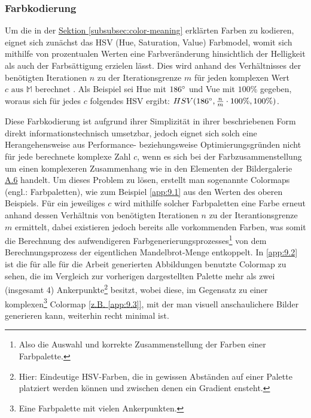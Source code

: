 \subsubsection{Farbkodierung}\label{subsubsec:color-coding}

Um die in der \hyperref[subsubsec:color-meaning]{Sektion \ref{subsubsec:color-meaning}}
erklärten Farben zu kodieren, eignet sich zunächst das HSV (Hue, Saturation, Value)
Farbmodel, womit sich mithilfe von prozentualen Werten eine
Farbveränderung hinsichtlich der Helligkeit als auch der Farbsättigung erzielen lässt.
Dies wird anhand des Verhältnisses der benötigten Iterationen $n$ zu der Iterationsgrenze $m$
für jeden komplexen Wert $c \text{ aus } \mathbb{M}$
berechnet \cite{robert_p_color_2022}.
Als Beispiel sei Hue mit $186\degree$ und Vue mit $100\%$ gegeben, woraus
sich für jedes $c$ folgendes HSV ergibt:
$ HSV(186\degree, \frac{n}{m} \cdot 100\%, 100\%)$.

Diese Farbkodierung ist aufgrund ihrer Simplizität in ihrer beschriebenen
Form direkt informationstechnisch umsetzbar, jedoch eignet sich solch eine
Herangehensweise aus Performance- beziehungsweise Optimierungsgründen nicht
für jede berechnete komplexe Zahl $c$, wenn es sich bei der
Farbzusammenstellung um einen komplexeren Zusammenhang wie in den Elementen
der Bildergalerie \hyperref[app:6]{A.6} handelt.
Um dieses Problem zu lösen, erstellt man sogenannte Colormaps
(engl.: Farbpaletten), wie zum Beispiel \hyperref[app:9.1]{\ref{app:9.1}}
aus den Werten des oberen Beispiels.
Für ein jeweiliges $c$ wird mithilfe solcher Farbpaletten eine Farbe erneut anhand
dessen Verhältnis von benötigten Iterationen $n$ zu der Iterantionsgrenze $m$
ermittelt, dabei existieren jedoch bereits alle vorkommenden Farben, was somit
die Berechnung des aufwendigeren Farbgenerierungsprozesses\footnote{
  Also die Auswahl und korrekte Zusammenstellung der Farben einer Farbpalette.
}
von dem Berechnungsprozess der eigentlichen Mandelbrot-Menge entkoppelt.
In \hyperref[app:9.2]{\ref{app:9.2}} ist die für alle für die Arbeit generierten
Abbildungen benutzte Colormap zu sehen, die im Vergleich zur vorherigen
dargestellten Palette mehr als zwei (insgesamt 4) Ankerpunkte\footnote{
  Hier: Eindeutige HSV-Farben, die in gewissen Abständen auf einer Palette
  platziert werden können und zwischen denen ein Gradient ensteht.
} besitzt, wobei diese, im Gegensatz zu einer komplexen\footnote{
  Eine Farbpalette mit vielen Ankerpunkten.
} Colormap \hyperref[app:9.3]{[z.B. \ref{app:9.3}]},
mit der man visuell anschaulichere Bilder generieren kann,
weiterhin recht minimal ist.